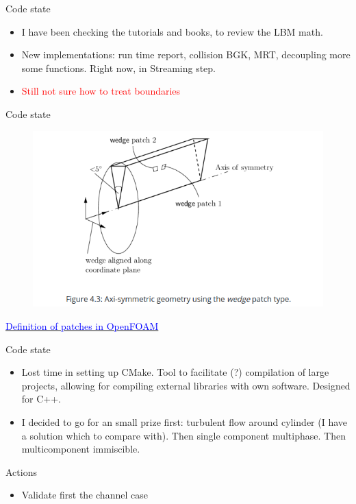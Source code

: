 \documentclass{beamer}
\begin{document}
	\begin{frame}{Code state}
		\begin{itemize}
			\item I have been checking the tutorials and books, to review the LBM math.
			\item New implementations: run time report, collision BGK, MRT, decoupling more some functions. Right now, in Streaming step.
			\item \textcolor{red}{Still not sure how to treat boundaries}
		\end{itemize}
	\end{frame}

	\begin{frame}{Code state}
		\begin{figure}
			\centering
			\includegraphics[scale=0.4]{pics/patchesOF.png}
		\end{figure}
		\href{https://www.openfoam.com/documentation/user-guide/4-mesh-generation-and-conversion/4.2-boundaries}{\textcolor{blue}{Definition of patches in OpenFOAM}}
	\end{frame}

	\begin{frame}{Code state}
		\begin{itemize}
			\item Lost time in setting up CMake. Tool to facilitate (?) compilation of large projects, allowing for compiling external libraries with own software. Designed for C++.
			\item I decided to go for an small prize first: turbulent flow around cylinder (I have a solution which to compare with). Then single component multiphase. Then multicomponent immiscible.
		\end{itemize}
	\end{frame}
	\begin{frame}{Actions}
		\begin{itemize}
			\item Validate first the channel case
		\end{itemize}
	\end{frame}
	
\end{document}
